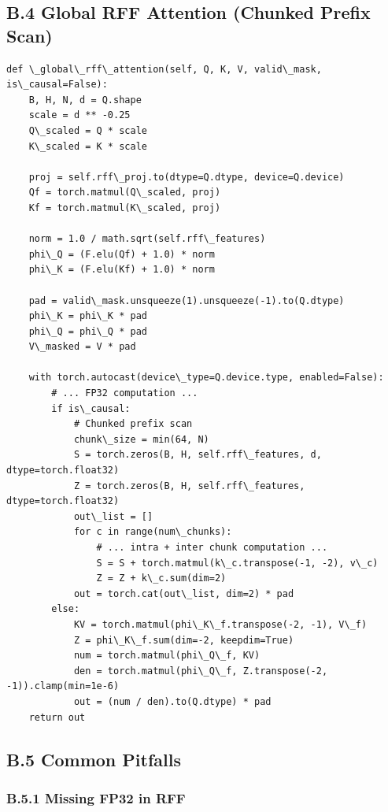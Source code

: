 \subsection{B.4 Global RFF Attention (Chunked Prefix Scan)}

\begin{lstlisting}
def \_global\_rff\_attention(self, Q, K, V, valid\_mask, is\_causal=False):
    B, H, N, d = Q.shape
    scale = d ** -0.25
    Q\_scaled = Q * scale
    K\_scaled = K * scale
    
    proj = self.rff\_proj.to(dtype=Q.dtype, device=Q.device)
    Qf = torch.matmul(Q\_scaled, proj)
    Kf = torch.matmul(K\_scaled, proj)
    
    norm = 1.0 / math.sqrt(self.rff\_features)
    phi\_Q = (F.elu(Qf) + 1.0) * norm
    phi\_K = (F.elu(Kf) + 1.0) * norm
    
    pad = valid\_mask.unsqueeze(1).unsqueeze(-1).to(Q.dtype)
    phi\_K = phi\_K * pad
    phi\_Q = phi\_Q * pad
    V\_masked = V * pad
    
    with torch.autocast(device\_type=Q.device.type, enabled=False):
        # ... FP32 computation ...
        if is\_causal:
            # Chunked prefix scan
            chunk\_size = min(64, N)
            S = torch.zeros(B, H, self.rff\_features, d, dtype=torch.float32)
            Z = torch.zeros(B, H, self.rff\_features, dtype=torch.float32)
            out\_list = []
            for c in range(num\_chunks):
                # ... intra + inter chunk computation ...
                S = S + torch.matmul(k\_c.transpose(-1, -2), v\_c)
                Z = Z + k\_c.sum(dim=2)
            out = torch.cat(out\_list, dim=2) * pad
        else:
            KV = torch.matmul(phi\_K\_f.transpose(-2, -1), V\_f)
            Z = phi\_K\_f.sum(dim=-2, keepdim=True)
            num = torch.matmul(phi\_Q\_f, KV)
            den = torch.matmul(phi\_Q\_f, Z.transpose(-2, -1)).clamp(min=1e-6)
            out = (num / den).to(Q.dtype) * pad
    return out
\end{lstlisting}

\subsection{B.5 Common Pitfalls}

\subsubsection{B.5.1 Missing FP32 in RFF}

